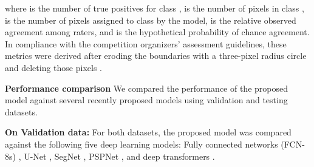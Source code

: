 \documentclass[journal]{IEEEtran}
\begin{document}
where  is the number of true positives for class ,  is the number of pixels in class , is the number of pixels assigned to class  by the model,  is the relative observed agreement among raters, and  is the hypothetical probability of chance agreement. In compliance with the competition organizers' assessment guidelines, these metrics were derived after eroding the boundaries with a three-pixel radius circle and deleting those pixels \cite{AUDEBERT201820}.

\textbf{Performance comparison}
We compared the performance of the proposed model against several recently proposed models using validation and testing datasets. 

\textbf{On Validation data:} For both datasets, the proposed model was compared against the following five deep learning models: Fully connected networks (FCN-8s) \cite{Long_2015_CVPR}, U-Net \cite{8309343}, SegNet \cite{7803544}, PSPNet \cite{8100143}, and deep transformers \cite{9491802}.  
\end{document}
